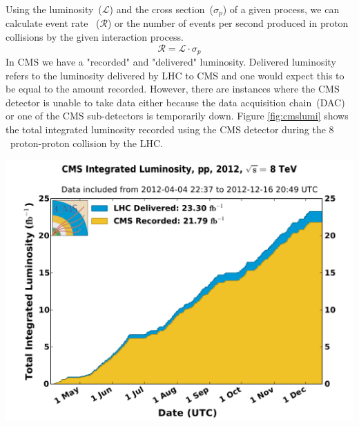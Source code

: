 Using the luminosity~($\mathscr{L}$) and the cross section~($\sigma_{p}$) of a given process, we can calculate
event rate ~($\mathscr{R}$) or the number of events per second produced in proton collisions by the given interaction process. 
\begin{equation}
\mathscr{R} = \mathscr{L} \cdot \sigma_{p}
\end{equation}
In CMS we have a "recorded" and "delivered" luminosity. Delivered luminosity refers to the luminosity delivered by LHC to CMS and one would expect this to be equal to  the amount recorded. However, there are instances where the CMS detector is unable to take data either because the data acquisition chain~(DAC) or one of the CMS sub-detectors is temporarily down.%
 Figure \ref{fig:cmslumi} shows the total integrated luminosity recorded using the CMS detector during the $8$~\TeV proton-proton collision by the LHC.
\begin{center}
\centering
\mbox{\includegraphics[scale=0.5]{THESISPLOTS/int_lumi_per_day_cumulative_pp_2012.pdf}
}
\label{fig:cmslumi}
\end{center}


